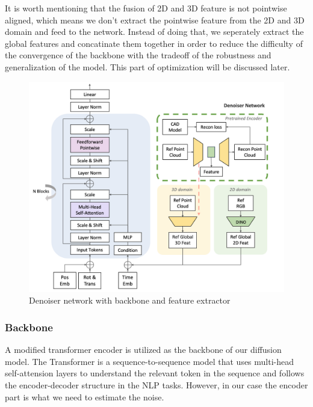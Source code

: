 \documentclass[12pt,DIV14,BCOR12mm,a4paper,footinclude=false,headinclude,parskip=half-,twoside,openright,cleardoublepage=empty,toc=index,bibliography=totoc,listof=totoc]{scrreprt}
\numberwithin{equation}{chapter}
\begin{document}
It is worth mentioning that the fusion of 2D and 3D feature is not pointwise aligned, which means we don't extract the pointwise feature from the 2D and 3D domain and feed to the network. Instead of doing that, we seperately extract the global features and concatinate them together in order to reduce the difficulty of the convergence of the backbone with the tradeoff of the robustness and generalization of the model. This part of optimization will be discussed later.
\begin{figure}[h]
	\centering
	\includegraphics[scale=.30]{img/denoiser.png}
	\caption{Denoiser network with backbone and feature extractor}
	\label{img:denoiser}
\end{figure}

\subsubsection{Backbone}
A modified transformer encoder is utilized as the backbone of our diffusion model. The Transformer\cite{vaswani2023attention} is a sequence-to-sequence model that uses multi-head self-attension layers to understand the relevant token in the sequence and follows the encoder-decoder structure in the NLP tasks. However, in our case the encoder part is what we need to estimate the noise.
\end{document}
